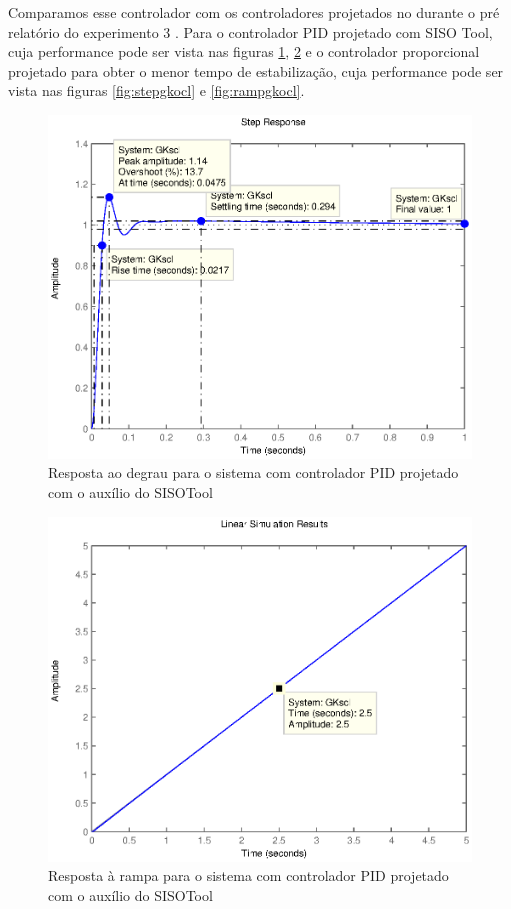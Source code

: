 \documentclass{article}
\begin{document}
Comparamos esse controlador com os controladores projetados no durante o pré relatório do experimento 3 \cite{bb:prelab3}. Para o controlador PID projetado com SISO Tool, cuja performance pode ser vista nas figuras \ref{fig:stepgkscl}, \ref{fig:rampgkscl} e o controlador proporcional projetado para obter o menor tempo de estabilização, cuja performance pode ser vista nas figuras \ref{fig:stepgkocl} e \ref{fig:rampgkocl}.

\begin{figure}[H]
	\centering
	\includegraphics[width=0.8\linewidth]{stepgkscl}
	\caption{Resposta ao degrau para o sistema com controlador PID projetado com o auxílio do SISOTool}
	\label{fig:stepgkscl}
\end{figure}
\begin{figure}[H]
	\centering
	\includegraphics[width=0.8\linewidth]{rampgkscl}
	\caption{Resposta à rampa para o sistema com controlador PID projetado com o auxílio do SISOTool}
	\label{fig:rampgkscl}
\end{figure}
\end{document}
